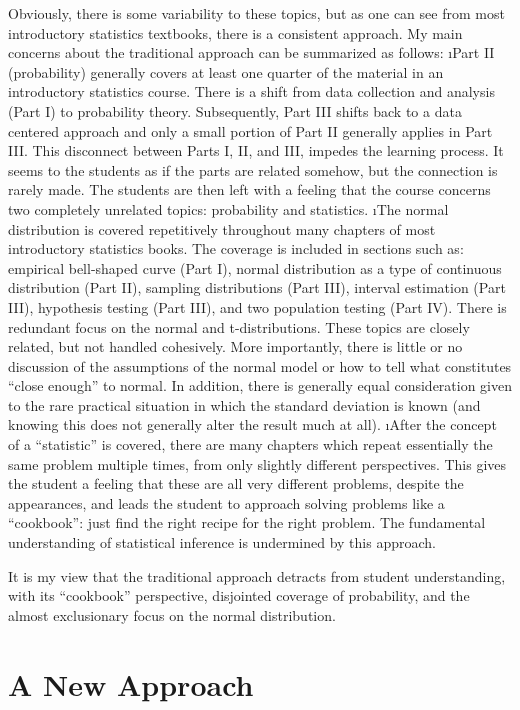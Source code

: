 Obviously, there is some variability to these topics, but as one can see from most introductory statistics textbooks, there is a consistent approach.  My main concerns about the traditional approach can be summarized as follows:
\be
\i Part II (probability) generally covers at least one quarter of the material in an introductory statistics course.  There is a shift from data collection and analysis (Part I) to probability theory.  Subsequently, Part III shifts back to a data centered approach and only a small portion of Part II generally applies in Part III.  This disconnect between Parts I, II, and III, impedes the learning process.  It seems to the students as if the parts are related somehow, but the connection is rarely made.  The students are then left with a feeling that the course concerns two completely unrelated topics: probability and statistics.
\i The normal distribution is covered repetitively throughout many chapters of most introductory statistics books.  The coverage is included in sections such as: empirical bell-shaped curve (Part I), normal distribution as a type of continuous distribution (Part II), sampling distributions (Part III), interval estimation (Part III), hypothesis testing (Part III), and two population testing (Part IV).  There is redundant focus on the normal and t-distributions.  These topics are closely related, but not handled cohesively.  More importantly, there is little or no discussion of the assumptions of the normal model or how to tell what constitutes ``close enough'' to normal.  In addition, there is generally equal consideration given to the rare practical situation in which the standard deviation is known (and knowing this does not generally alter the result much at all). 
\i After the concept of a ``statistic'' is covered, there are many chapters which repeat essentially the same problem multiple times, from only slightly different perspectives.  This gives the student a feeling that these are all very different problems, despite the appearances, and leads the student to approach solving problems like a ``cookbook'': just find the right recipe for the right problem.  The fundamental understanding of statistical inference is undermined by this approach. 
\ee

It is my view that the traditional approach detracts from student understanding, with its ``cookbook'' perspective, disjointed coverage of probability, and the almost exclusionary focus on the normal distribution. 

\section*{A New Approach}

